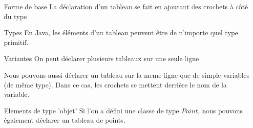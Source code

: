 \begin{frame}{Forme de base}
    La déclaration d'un tableau se fait en ajoutant des crochets à côté du type
    

    \begin{exampleblock}{Types}
        En Java, les éléments d'un tableau peuvent être de n'importe quel type primitif.
    \end{exampleblock}

    

\end{frame}

\begin{frame}{Variantes}
    On peut déclarer plusieurs tableaux sur une seule ligne
    
    Nous pouvons aussi déclarer un tableau sur la meme ligne que de simple variables (de même type).
    Dans ce cas, les crochets se mettent derrière le nom de la variable.
    
\end{frame}

\begin{frame}{Elements de type 'objet'}
    Si l'on a défini une classe de type $Point$, nous pouvons également déclarer un tableau de points.

    
\end{frame}
